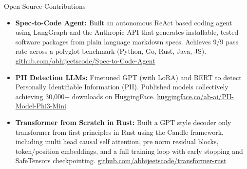 \documentclass{resume}
\begin{document}
\begin{rSection}{Open Source Contributions}
\begin{itemize}
    \item \textbf{Spec-to-Code Agent:} Built an autonomous ReAct based coding agent using LangGraph and the Anthropic API that generates installable, tested software packages from plain language markdown specs. Achieves 9/9 pass rate across a polyglot benchmark (Python, Go, Rust, Java, JS). \href{https://github.com/abhijeetscode/Spec-to-Code-Agent}{github.com/abhijeetscode/Spec-to-Code-Agent}
    \item \textbf{PII Detection LLMs:} Finetuned GPT (with LoRA) and BERT to detect Personally Identifiable Information (PII). Published models collectively achieving 30,000+ downloads on HuggingFace. \href{https://huggingface.co/ab-ai/PII-Model-Phi3-Mini}{huggingface.co/ab-ai/PII-Model-Phi3-Mini}
    \item \textbf{Transformer from Scratch in Rust:} Built a GPT style decoder only transformer from first principles in Rust using the Candle framework, including multi head causal self attention, pre norm residual blocks, token/position embeddings, and a full training loop with early stopping and SafeTensors checkpointing. \href{https://github.com/abhijeetscode/transformer-rust}{github.com/abhijeetscode/transformer-rust}
\end{itemize}
\end{rSection}
\end{document}
